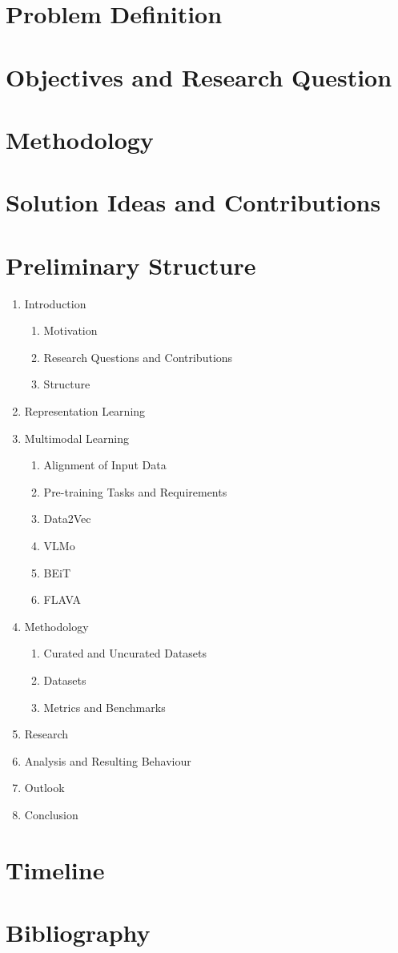 \chapter{Problem Definition}

\chapter{Objectives and Research Question}

\chapter{Methodology}

\chapter{Solution Ideas and Contributions}

\chapter{Preliminary Structure}

\begin{enumerate}
    \item Introduction
        \begin{enumerate}
            \item Motivation
            \item Research Questions and Contributions
            \item Structure
        \end{enumerate}
    \item Representation Learning
    \item Multimodal Learning
        \begin{enumerate}
            \item Alignment of Input Data
            \item Pre-training Tasks and Requirements
            \item Data2Vec
            \item VLMo
            \item BEiT
            \item FLAVA
        \end{enumerate}
    \item Methodology
        \begin{enumerate}
            \item Curated and Uncurated Datasets
            \item Datasets
            \item Metrics and Benchmarks
        \end{enumerate}
    \item Research
    \item Analysis and Resulting Behaviour
    \item Outlook
    \item Conclusion
\end{enumerate}

\chapter{Timeline}

\chapter{Bibliography}